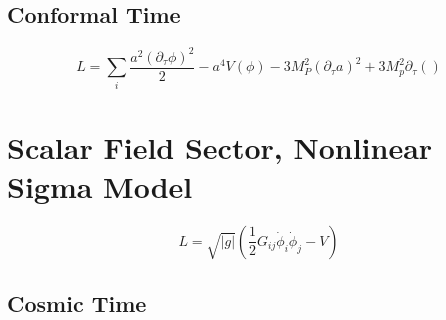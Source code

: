 \documentclass{article}
\begin{document}
\subsection{Conformal Time}
\begin{equation}
  L = \sum_i\frac{a^2(\partial_\tau\phi)^2}{2} - a^4V(\phi) - 3M_P^2(\partial_\tau a)^2 + 3M_p^2\partial_\tau()
\end{equation}

\section{Scalar Field Sector, Nonlinear Sigma Model}
\begin{equation}
  L = \sqrt{|g|}\left(\frac{1}{2}G_{ij}\dot{\phi}_i\dot{\phi}_j - V\right)
\end{equation}
\subsection{Cosmic Time}
\end{document}
